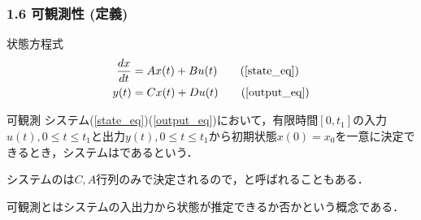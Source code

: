 \begin{frame}[t]
\frametitle{1.6 可観測性 (定義)}
状態方程式
\begin{align}
 \frac{dx}{dt} &= A x(t) + B u(t) \tag{\ref{state_eq}} \\
 y(t) &= C x(t) + D u(t) \tag{\ref{output_eq}}
\end{align}
\begin{block}{可観測}
システム(\ref{state_eq})(\ref{output_eq})において，有限時間$[0,t_1]$の入力$u(t),0 \leq t \leq t_1$と出力$y(t), 0 \leq t \leq t_1$から初期状態$x(0)=x_0$を一意に決定できるとき，システムはであるという．
\end{block}

システムのは$C,A$行列のみで決定されるので，と呼ばれることもある．

可観測とはシステムの入出力から状態が推定できるか否かという概念である．
\end{frame}


